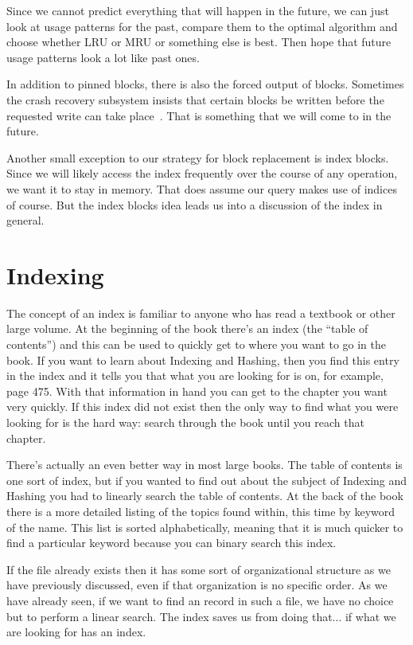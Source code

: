 \documentclass[a4paper]{report}
\begin{document}
Since we cannot predict everything that will happen in the future, we can just look at usage patterns for the past, compare them to the optimal algorithm and choose whether LRU or MRU or something else is best. Then hope that future usage patterns look a lot like past ones.

In addition to pinned blocks, there is also the forced output of blocks. Sometimes the crash recovery subsystem insists that certain blocks be written before the requested write can take place~\cite{dsc}. That is something that we will come to in the future. 


Another small exception to our strategy for block replacement is index blocks. Since we will likely access the index frequently over the course of any operation, we want it to stay in memory. That does assume our query makes use of indices of course. But the index blocks idea leads us into a discussion of the index in general.

\section*{Indexing}

The concept of an index is familiar to anyone who has read a textbook or other large volume. At the beginning of the book there's an index (the ``table of contents'') and this can be used to quickly get to where you want to go in the book. If you want to learn about Indexing and Hashing, then you find this entry in the index and it tells you that what you are looking for is on, for example, page 475. With that information in hand you can get to the chapter you want very quickly. If this index did not exist then the only way to find what you were looking for is the hard way: search through the book until you reach that chapter.

There's actually an even better way in most large books. The table of contents is one sort of index, but if you wanted to find out about the subject of Indexing and Hashing you had to linearly search the table of contents. At the back of the book there is a more detailed listing of the topics found within, this time by keyword of the name. This list is sorted alphabetically, meaning that it is much quicker to find a particular keyword because you can binary search this index.

If the file already exists then it has some sort of organizational structure as we have previously discussed, even if that organization is no specific order. As we have already seen, if we want to find an record in such a file, we have no choice but to perform a linear search. The index saves us from doing that... if what we are looking for has an index.
\end{document}
